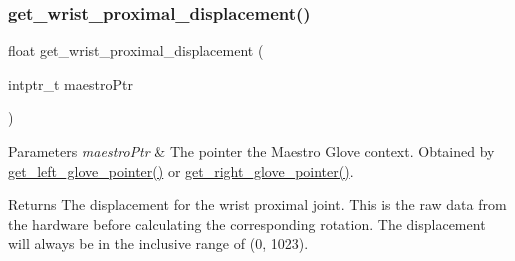 \subsubsection{\texorpdfstring{get\+\_\+wrist\+\_\+proximal\+\_\+displacement()}{get\_wrist\_proximal\_displacement()}}
{\footnotesize\ttfamily float get\+\_\+wrist\+\_\+proximal\+\_\+displacement (\begin{DoxyParamCaption}\item[{intptr\+\_\+t}]{maestro\+Ptr }\end{DoxyParamCaption})}


\begin{DoxyParams}{Parameters}
{\em maestro\+Ptr} & The pointer the Maestro Glove context. Obtained by \hyperlink{group__glove_management_ga63ce3c99d4a8b8db851b22af9185764e}{get\+\_\+left\+\_\+glove\+\_\+pointer()} or \hyperlink{group__glove_management_ga9b8fd9d91aeac3f8da50f7a7eba0c32b}{get\+\_\+right\+\_\+glove\+\_\+pointer()}. \\
\hline
\end{DoxyParams}
\begin{DoxyReturn}{Returns}
The displacement for the wrist proximal joint. This is the raw data from the hardware before calculating the corresponding rotation. The displacement will always be in the inclusive range of (0, 1023). 
\end{DoxyReturn}
